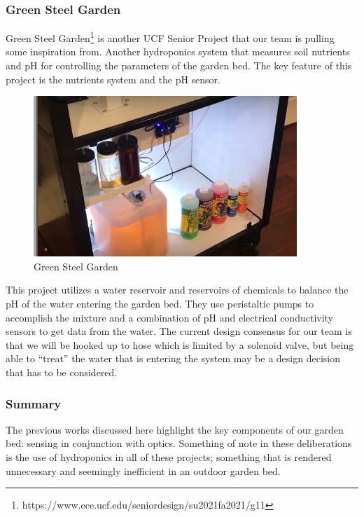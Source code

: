 \subsubsection{Green Steel Garden}
Green Steel Garden\footnote{https://www.ece.ucf.edu/seniordesign/su2021fa2021/g11} is another UCF Senior Project that our team is pulling some inspiration from. Another hydroponics system that measures soil nutrients and pH for controlling the parameters of the garden bed. The key feature of this project is the nutrients system and the pH sensor.

\begin{figure}[H]
    \caption{Green Steel Garden}
    \centering
    \includegraphics[width=\textwidth]{images/3-1-6Pic.png}
\end{figure}

This project utilizes a water reservoir and reservoirs of chemicals to balance the pH of the water entering the garden bed. They use peristaltic pumps to accomplish the mixture and a combination of pH and electrical conductivity sensors to get data from the water. The current design consensus for our team is that we will be hooked up to hose which is limited by a solenoid valve, but being able to ``treat'' the water that is entering the system may be a design decision that has to be considered.

\subsubsection{Summary}

The previous works discussed here highlight the key components of our garden bed: sensing in conjunction with optics. Something of note in these deliberations is the use of hydroponics in all of these projects; something that is rendered unnecessary and seemingly inefficient in an outdoor garden bed.

